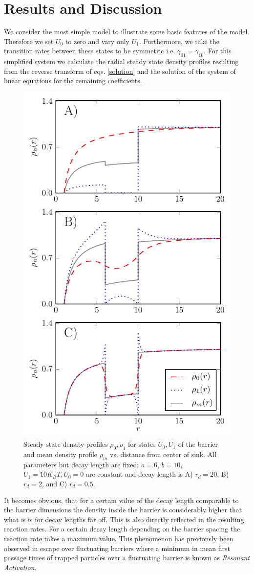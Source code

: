 \documentclass[twocolumn,superscriptaddress]{revtex4}
\begin{document}
\section{Results and Discussion}
We consider the most simple model to illustrate some basic features of the model. Therefore we set $U_0$ to zero and vary only $U_1$. Furthermore, we take the transition rates between these states to be symmetric i.e. $\gamma_{01}=\gamma_{10}$.
For this simplified system we calculate the radial steady state density profiles resulting from the reverse transform of eqs. \eqref{solution} and the solution of the system of linear equations for the remaining coefficients.
\begin{figure}[H]
\includegraphics[width= .5 \textwidth]{plots/density_profiles.pdf}
\caption{Steady state density profiles $\rho_0, \rho_1$ for states $U_0, U_1$ of the barrier and mean density profile $\rho_m$ vs. distance from center of sink. All parameters but decay length are fixed: $a=6$, $b=10$, $U_1 = 10 K_B T, U_0 = 0$ are constant and decay length is A) $r_d = 20$, B) $r_d=2$, and C) $r_d=0.5$.}
\label{fig1}
\end{figure}
It becomes obvious, that for a certain value of the decay length comparable to the barrier dimensions the density inside the barrier is considerably higher that what is is for decay lengths far off. This is also directly reflected in the resulting reaction rates. For a certain decay length depending on the barrier spacing the reaction rate takes a maximum value. This phenomenon has previously been observed in escape over fluctuating barriers where a minimum in mean first passage times of trapped particles over a fluctuating barrier is known as \emph{Resonant Activation}.
\end{document}
